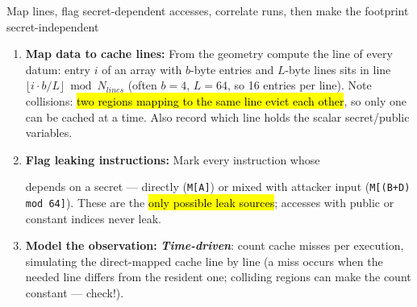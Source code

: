 \documentclass[12pt, a4paper]{article}
\newcommand{\term}[1]{\textbf{\textit{#1}}}        %
\newcommand{\imp}[1]{\hl{#1}}                       %
\begin{document}
\begin{schemebox}{Map lines, flag secret-dependent accesses, correlate runs, then make the footprint secret-independent}
\begin{enumerate}[label=\textbf{Step \arabic*:}, leftmargin=*]
    \item \textbf{Map data to cache lines:} From the geometry compute the line of every datum: entry $i$ of an array with $b$-byte entries and $L$-byte lines sits in line $\lfloor i \cdot b / L \rfloor \bmod N_{lines}$ (often $b=4$, $L=64$, so 16 entries per line).
    Note collisions: \imp{two regions mapping to the same line evict each other}, so only one can be cached at a time. Also record which line holds the scalar secret/public variables.
    \item \textbf{Flag leaking instructions:} Mark every instruction whose
    depends on a secret --- directly (\texttt{M[A]}) or mixed with attacker input (\texttt{M[(B+D) mod 64]}). These are the \imp{only possible leak sources}; accesses with public or constant indices never leak.
    \item \textbf{Model the observation:} \term{Time-driven}: count cache misses per execution, simulating the direct-mapped cache line by line (a miss occurs when the needed line differs from the resident one; colliding regions can make the count constant --- check!).


\end{enumerate}
\end{schemebox}
\end{document}
